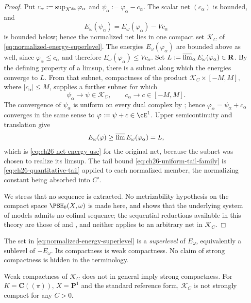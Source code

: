 \begin{proof}
Put $c_\alpha:=\sup_{X^{\An}}\varphi_\alpha$ and
$\psi_\alpha:=\varphi_\alpha-c_\alpha$.  The scalar net $(c_\alpha)$ is
bounded, and
\[
 E_\omega(\psi_\alpha)=E_\omega(\varphi_\alpha)-Vc_\alpha
\]
is bounded below; hence the normalized net lies in one compact set
$\mathcal K_C$ of \eqref{eq:normalized-energy-superlevel}.  The energies
$E_\omega(\varphi_\alpha)$ are bounded above as well, since
$\varphi_\alpha\leq c_\alpha$ and therefore
$E_\omega(\varphi_\alpha)\leq Vc_\alpha$.  Set
$L:=\varlimsup_\alpha E_\omega(\varphi_\alpha)\in\mathbf R$.  By the
defining property of a limsup, there is a subnet along which the energies
converge to $L$.  From that subnet, compactness of the product
$\mathcal K_C\times[-M,M]$, where $|c_\alpha|\leq M$, supplies a further
subnet for which
\[
 \psi_\alpha\longrightarrow\psi\in\mathcal K_C,
 \qquad c_\alpha\longrightarrow c\in[-M,M].
\]
The convergence of $\psi_\alpha$ is uniform on every dual complex by
; hence
$\varphi_\alpha=\psi_\alpha+c_\alpha$ converges in the same sense to
$\varphi:=\psi+c\in\cE^1$.  Upper semicontinuity and translation give
\[
 E_\omega(\varphi)\geq
 \varlimsup E_\omega(\varphi_\alpha)=L,
\]
which is \eqref{eq:ch26-net-energy-usc} for the original net, because the
subnet was chosen to realize its limsup.  The tail bound
\eqref{eq:ch26-uniform-tail-family} is
\eqref{eq:ch26-quantitative-tail} applied to each normalized member, the
normalizing constant being absorbed into $C'$.

We stress that no sequence is extracted.  No metrizability hypothesis on the compact space $\PSH_0(X,\omega)$ is
made here, and
 shows that the underlying system of
models admits no cofinal sequence; the sequential reductions available in
this theory are those of
 and
, and neither applies to an arbitrary net in
$\mathcal K_C$.
\end{proof}

\begin{remark}
\label{rem:ch26-energy-superlevel-terminology}
The set in \eqref{eq:normalized-energy-superlevel} is a \emph{superlevel}
of $E_\omega$, equivalently a sublevel of $-E_\omega$. Its compactness is weak compactness. No claim of strong compactness
is hidden in the terminology.
\end{remark}

\begin{proposition}
\label{prop:ch26-no-strong-compactness}
Weak compactness of $\mathcal K_C$ does not in general imply strong
compactness.  For $K=\mathbf C((\pi))$, $X=\mathbf P^1$ and the standard
reference form, $\mathcal K_C$ is not strongly compact for any $C>0$.
\end{proposition}


